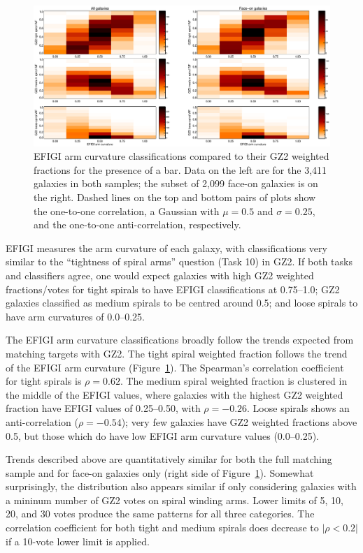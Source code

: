 \documentclass[useAMS,usenatbib]{mn2e}
\begin{document}
\begin{figure}
\includegraphics[angle=0,width=7.0in]{figures/efigi_arm_curvature.eps}
\caption{EFIGI arm curvature classifications compared to their GZ2 weighted fractions for the presence of a bar. Data on the left are for the 3,411 galaxies in both samples; the subset of 2,099 face-on galaxies is on the right. Dashed lines on the top and bottom pairs of plots show the one-to-one correlation, a Gaussian with $\mu=0.5$ and $\sigma=0.25$, and the one-to-one anti-correlation, respectively. 
\label{fig-efigi_arms}}
\end{figure}

EFIGI measures the arm curvature of each galaxy, with classifications very similar to the ``tightness of spiral arms'' question (Task 10) in GZ2. If both tasks and classifiers agree, one would expect galaxies with high GZ2 weighted fractions/votes for tight spirals to have EFIGI classifications at 0.75--1.0; GZ2 galaxies classified as medium spirals to be centred around 0.5; and loose spirals to have arm curvatures of 0.0--0.25. 

The EFIGI arm curvature classifications broadly follow the trends expected from matching targets with GZ2. The tight spiral weighted fraction follows the trend of the EFIGI arm curvature (Figure~\ref{fig-efigi_arms}). The Spearman's correlation coefficient for tight spirals is $\rho=0.62$. The medium spiral weighted fraction is clustered in the middle of the EFIGI values, where galaxies with the highest GZ2 weighted fraction have EFIGI values of 0.25--0.50, with $\rho=-0.26$. Loose spirals shows an anti-correlation ($\rho=-0.54$); very few galaxies have GZ2 weighted fractions above 0.5, but those which do have low EFIGI arm curvature values (0.0--0.25). 

Trends described above are quantitatively similar for both the full matching sample and for face-on galaxies only (right side of Figure~\ref{fig-efigi_arms}). Somewhat surprisingly, the distribution also appears similar if only considering galaxies with a mininum number of GZ2 votes on spiral winding arms. Lower limits of 5, 10, 20, and 30 votes produce the same patterns for all three categories. The correlation coefficient for both tight and medium spirals does decrease to $|\rho<0.2|$ if a 10-vote lower limit is applied. 
\end{document}
